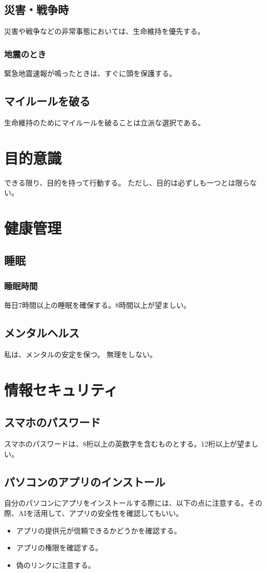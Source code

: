 \documentclass[dvipdfmx]{jlreq}
\begin{document}
    \subsection{災害・戦争時}
        災害や戦争などの非常事態においては、生命維持を優先する。
        \subsubsection{地震のとき}
            緊急地震速報が鳴ったときは、すぐに頭を保護する。

    \subsection{マイルールを破る}
        生命維持のためにマイルールを破ることは立派な選択である。


\section{目的意識}
    できる限り、目的を持って行動する。
    ただし、目的は必ずしも一つとは限らない。

\section{健康管理}
    \subsection{睡眠}
    \subsubsection{睡眠時間}
        毎日7時間以上の睡眠を確保する。8時間以上が望ましい。
    \subsection{メンタルヘルス}
        私は、メンタルの安定を保つ。
        無理をしない。

\section{情報セキュリティ}
    \subsection{スマホのパスワード}
        スマホのパスワードは、8桁以上の英数字を含むものとする。12桁以上が望ましい。
    \subsection{パソコンのアプリのインストール}
        自分のパソコンにアプリをインストールする際には、以下の点に注意する。その際、AIを活用して、アプリの安全性を確認してもいい。
    \begin{itemize}
        \item アプリの提供元が信頼できるかどうかを確認する。
        \item アプリの権限を確認する。
        \item 偽のリンクに注意する。
    \end{itemize}
\end{document}
